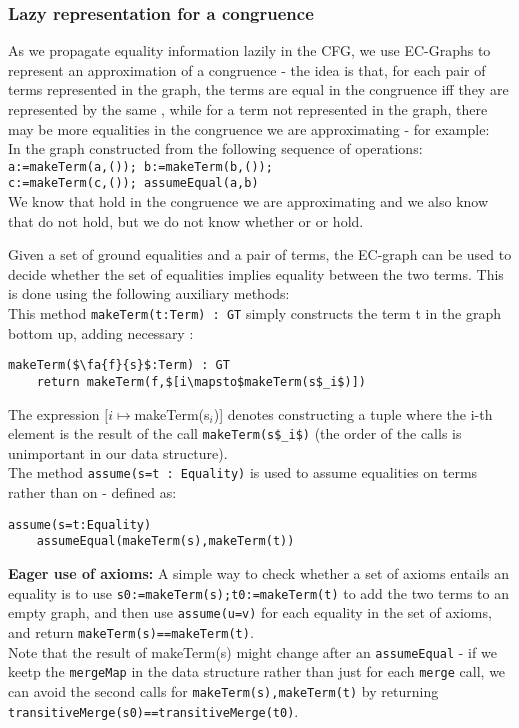 \subsubsection*{Lazy representation for a congruence}
As we propagate equality information lazily in the CFG, we use EC-Graphs to represent an approximation of a congruence - the idea is that, for each pair of terms represented in the graph, the terms are equal in the congruence iff they are represented by the same \GT{}, while for a term not represented in the graph, there may be more equalities in the congruence we are approximating - for example:\\
In the graph constructed from the following sequence of operations:\\
\lstinline|a:=makeTerm(a,()); b:=makeTerm(b,());|\\
\lstinline|c:=makeTerm(c,()); assumeEqual(a,b)|\\
We know that  hold in the congruence we are approximating and we also know that  do not hold, 
but we do not know whether  or  or  hold.

\bigskip
\noindent
Given a set of ground equalities and a pair of terms, the EC-graph can be used to decide whether the set of equalities implies equality between the two terms. This is done using the following auxiliary methods:\\
This method \lstinline|makeTerm(t:Term) : GT| simply constructs the term t in the graph bottom up, adding necessary \GTs{}:
\begin{lstlisting}
makeTerm($\fa{f}{s}$:Term) : GT
	return makeTerm(f,$[i\mapsto$makeTerm(s$_i$)])
\end{lstlisting}
The expression $[i\mapsto$makeTerm(s$_i$)] denotes constructing a tuple where the i-th element is the result of the call \lstinline|makeTerm(s$_i$)| (the order of the calls is unimportant in our data structure).\\
The method \lstinline|assume(s=t : Equality)| is used to assume equalities on terms rather than on \GTs{} - defined as:
\begin{lstlisting}
assume(s=t:Equality)
	assumeEqual(makeTerm(s),makeTerm(t))
\end{lstlisting}

\bigskip
\noindent
\textbf{Eager use of axioms:}
A simple way to check whether a set of axioms entails an equality  is to use \lstinline|s0:=makeTerm(s);t0:=makeTerm(t)| to add the two terms to an empty graph, and then use
\lstinline|assume(u=v)| for each equality  in the set of axioms, and return \lstinline|makeTerm(s)==makeTerm(t)|.\\
Note that the result of makeTerm(s) might change after an \lstinline|assumeEqual| - if we keetp the \lstinline|mergeMap| in the data structure rather than just for each \lstinline|merge| call, we can avoid the second calls for \lstinline|makeTerm(s),makeTerm(t)| by returning \lstinline|transitiveMerge(s0)==transitiveMerge(t0)|.

